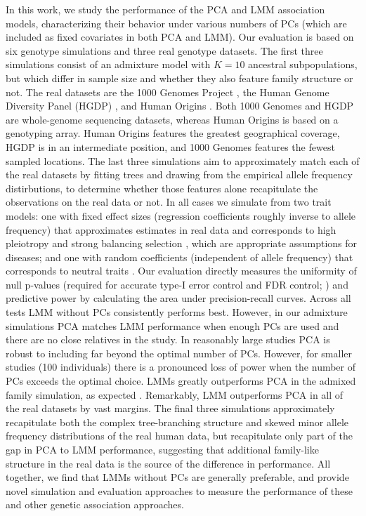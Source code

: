 \documentclass[11pt]{article}
\begin{document}
In this work, we study the performance of the PCA and LMM association models, characterizing their behavior under various numbers of PCs (which are included as fixed covariates in both PCA and LMM).
Our evaluation is based on six genotype simulations and three real genotype datasets.
The first three simulations consist of an admixture model with $K = 10$ ancestral subpopulations, but which differ in sample size and whether they also feature family structure or not.
The real datasets are the 1000 Genomes Project \citep{the_1000_genomes_project_consortium_map_2010, 1000_genomes_project_consortium_integrated_2012}, the Human Genome Diversity Panel (HGDP) \citep{cann_human_2002, rosenberg_genetic_2002, bergstrom_insights_2020}, and Human Origins \citep{patterson_ancient_2012, lazaridis_ancient_2014, lazaridis_genomic_2016, skoglund_genomic_2016}.
Both 1000 Genomes and HGDP are whole-genome sequencing datasets, whereas Human Origins is based on a genotyping array.
Human Origins features the greatest geographical coverage, HGDP is in an intermediate position, and 1000 Genomes features the fewest sampled locations.
The last three simulations aim to approximately match each of the real datasets by fitting trees and drawing from the empirical allele frequency distirbutions, to determine whether those features alone recapitulate the observations on the real data or not.
In all cases we simulate from two trait models: one with fixed effect sizes (regression coefficients roughly inverse to allele frequency) that approximates estimates in real data \citep{park_distribution_2011} and corresponds to high pleiotropy and strong balancing selection \citep{simons_population_2018}, which are appropriate assumptions for diseases; and one with random coefficients (independent of allele frequency) that corresponds to neutral traits \citep{simons_population_2018}.
Our evaluation directly measures the uniformity of null p-values (required for accurate type-I error control and FDR control; \cite{storey_positive_2003, storey_statistical_2003}) and predictive power by calculating the area under precision-recall curves.
Across all tests LMM without PCs consistently performs best.
However, in our admixture simulations PCA matches LMM performance when enough PCs are used and there are no close relatives in the study.
In reasonably large studies PCA is robust to including far beyond the optimal number of PCs.
However, for smaller studies (100 individuals) there is a pronounced loss of power when the number of PCs exceeds the optimal choice.
LMMs greatly outperforms PCA in the admixed family simulation, as expected \citep{patterson_population_2006, price_new_2010}.
Remarkably, LMM outperforms PCA in all of the real datasets by vast margins.
The final three simulations approximately recapitulate both the complex tree-branching structure and skewed minor allele frequency distributions of the real human data, but recapitulate only part of the gap in PCA to LMM performance, suggesting that additional family-like structure in the real data is the source of the difference in performance.
All together, we find that LMMs without PCs are generally preferable, and provide novel simulation and evaluation approaches to measure the performance of these and other genetic association approaches.
\end{document}
